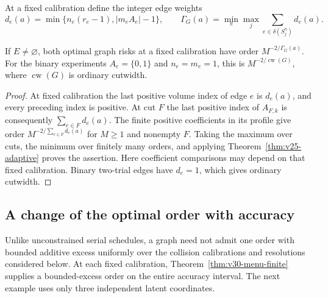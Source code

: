 At a fixed calibration define the integer edge weights
\[
 d_e(a)=\min\{n_e(r_e-1),|m_eA_e|-1\},\qquad
 \Gamma_G(a)=\min_\pi\max_j\sum_{e\in\delta(S_j^\pi)}d_e(a).
\]
\begin{corollary}\label{cor:v25-cutwidth}
If $E\ne\varnothing$, both optimal graph risks at a fixed calibration
have order $M^{-2/\Gamma_G(a)}$. For the binary experiments
$A_e=\{0,1\}$ and $n_e=m_e=1$, this is $M^{-2/\operatorname{cw}(G)}$,
where $\operatorname{cw}(G)$ is ordinary cutwidth.
\end{corollary}
\begin{proof}
At fixed calibration the last positive volume index of edge $e$ is
$d_e(a)$, and every preceding index is positive. At cut $F$ the last
positive index of $A_{F,k}$ is consequently $\sum_{e\in F}d_e(a)$.
The finite positive coefficients in its profile give order
$M^{-2/\sum_{e\in F}d_e(a)}$ for $M\ge1$ and nonempty $F$.
Taking the maximum over cuts, the minimum over finitely many orders,
and applying Theorem~\ref{thm:v25-adaptive} proves the assertion.
Here coefficient comparisons may depend on that fixed calibration.
Binary two-trial edges have $d_e=1$, which gives ordinary cutwidth.
\end{proof}

\subsection{A change of the optimal order with accuracy}
Unlike unconstrained serial schedules, a graph need not admit one
order with bounded additive excess uniformly over the collision
calibrations and resolutions considered below. At each fixed
calibration, Theorem~\ref{thm:v30-menu-finite} supplies a bounded-excess
order on the entire accuracy interval. The next example uses only
three independent latent coordinates.

